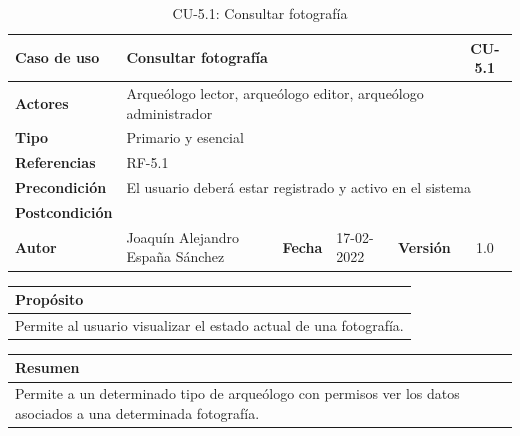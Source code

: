    \begin{table}[H]
    \begin{center}
        \begin{adjustbox}{width=\textwidth}
        \begin{tabular}{ | l | l | l | l | c | c | } 
            \hline
            \textbf{Caso de uso} & \multicolumn{4}{l|}{Consultar fotografía} & \cellcolor{gray!50} \textbf{CU-5.1}\\
            \hline
            \textbf{Actores} & \multicolumn{5}{p{0.9\linewidth}|}{Arqueólogo lector, arqueólogo editor, arqueólogo administrador} \\
            \hline
            \textbf{Tipo} & \multicolumn{5}{l|}{Primario y esencial} \\
            \hline
            \textbf{Referencias} & \multicolumn{3}{l|}{RF-5.1} & \multicolumn{2}{l|}{ }\\
            \hline
            \textbf{Precondición} & \multicolumn{5}{l|}{El usuario deberá estar registrado y activo en el sistema} \\
            \hline
            \textbf{Postcondición} & \multicolumn{5}{l|}{ } \\
            \hline
            \textbf{Autor} & \multicolumn{1}{p{0.25\linewidth}|}{Joaquín Alejandro España Sánchez} & \textbf{Fecha} & 
            17-02-2022     & \textbf{Versión}                                                      & 1.0\\
            \hline
        \end{tabular}
        \end{adjustbox}
        \caption{CU-5.1: Consultar fotografía}
        \label{tab:consult-photo}
    \end{center}
    \end{table}

    \begin{table}[H]
        \centering
        \begin{tabularx}{\textwidth}{@{} |L |@{}} \hline
            \textbf{Propósito} \\
            \hline
            Permite al usuario visualizar el estado actual de una fotografía. \\
            \hline
        \end{tabularx}
    \end{table}

    \begin{table}[H]
        \centering
        \begin{tabularx}{\textwidth}{@{} |L |@{}} \hline
            \textbf{Resumen} \\
            \hline
            Permite a un determinado tipo de arqueólogo con permisos ver los datos asociados
            a una determinada fotografía. \\
            \hline
        \end{tabularx}
    \end{table}

